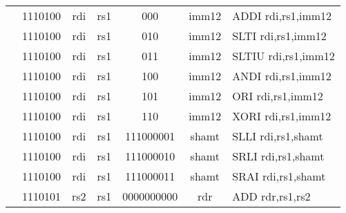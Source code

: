\begin{table}[p]
\begin{small}
\begin{center}
\begin{tabular}{rcccccccccl}
&
\multicolumn{2}{|c|}{1110100} &
\multicolumn{1}{c|}{rdi} &
\multicolumn{1}{c|}{rs1} &
\multicolumn{1}{c|}{000} &
\multicolumn{4}{c|}{imm12} & ADDI rdi,rs1,imm12 \\
\cline{2-10}
  

&
\multicolumn{2}{|c|}{1110100} &
\multicolumn{1}{c|}{rdi} &
\multicolumn{1}{c|}{rs1} &
\multicolumn{1}{c|}{010} &
\multicolumn{4}{c|}{imm12} & SLTI rdi,rs1,imm12 \\
\cline{2-10}
  

&
\multicolumn{2}{|c|}{1110100} &
\multicolumn{1}{c|}{rdi} &
\multicolumn{1}{c|}{rs1} &
\multicolumn{1}{c|}{011} &
\multicolumn{4}{c|}{imm12} & SLTIU rdi,rs1,imm12 \\
\cline{2-10}
  

&
\multicolumn{2}{|c|}{1110100} &
\multicolumn{1}{c|}{rdi} &
\multicolumn{1}{c|}{rs1} &
\multicolumn{1}{c|}{100} &
\multicolumn{4}{c|}{imm12} & ANDI rdi,rs1,imm12 \\
\cline{2-10}
  

&
\multicolumn{2}{|c|}{1110100} &
\multicolumn{1}{c|}{rdi} &
\multicolumn{1}{c|}{rs1} &
\multicolumn{1}{c|}{101} &
\multicolumn{4}{c|}{imm12} & ORI rdi,rs1,imm12 \\
\cline{2-10}
  

&
\multicolumn{2}{|c|}{1110100} &
\multicolumn{1}{c|}{rdi} &
\multicolumn{1}{c|}{rs1} &
\multicolumn{1}{c|}{110} &
\multicolumn{4}{c|}{imm12} & XORI rdi,rs1,imm12 \\
\cline{2-10}
  

&
\multicolumn{2}{|c|}{1110100} &
\multicolumn{1}{c|}{rdi} &
\multicolumn{1}{c|}{rs1} &
\multicolumn{3}{c|}{111000001} &
\multicolumn{2}{c|}{shamt} & SLLI rdi,rs1,shamt \\
\cline{2-10}
  

&
\multicolumn{2}{|c|}{1110100} &
\multicolumn{1}{c|}{rdi} &
\multicolumn{1}{c|}{rs1} &
\multicolumn{3}{c|}{111000010} &
\multicolumn{2}{c|}{shamt} & SRLI rdi,rs1,shamt \\
\cline{2-10}
  

&
\multicolumn{2}{|c|}{1110100} &
\multicolumn{1}{c|}{rdi} &
\multicolumn{1}{c|}{rs1} &
\multicolumn{3}{c|}{111000011} &
\multicolumn{2}{c|}{shamt} & SRAI rdi,rs1,shamt \\
\cline{2-10}
  

&
\multicolumn{2}{|c|}{1110101} &
\multicolumn{1}{c|}{rs2} &
\multicolumn{1}{c|}{rs1} &
\multicolumn{4}{c|}{0000000000} &
\multicolumn{1}{c|}{rdr} & ADD rdr,rs1,rs2 \\
\cline{2-10}
  


\end{tabular}
\end{center}
\end{small}
\end{table}
